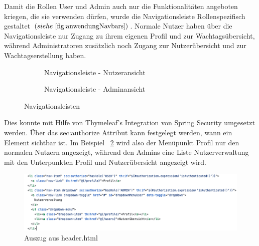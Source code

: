 \documentclass[fontsize=12pt,openright,oneside,paper=a4,BCOR=1cm]{scrbook}
\begin{document}
Damit die Rollen \glqq User\grqq{} und \glqq Admin\grqq{} auch nur die Funktionalit\"aten angeboten kriegen, die sie verwenden d\"urfen, wurde die Navigationsleiste Rollenspezifisch gestaltet $(siehe ~\ref{fig:anwendungNavbars})$. Normale Nutzer haben \"uber die Navigationsleiste nur Zugang zu ihrem eigenen Profil und zur Wachtags\"ubersicht, w\"ahrend Administratoren zus\"atzlich noch Zugang zur Nutzer\"ubersicht und zur Wachtagserstellung haben.

\begin{figure}[H]
  \centering
  \begin{subfigure}[b]{0.5\linewidth}
    \caption{Navigationsleiste - Nutzeransicht}
  \end{subfigure}
  \begin{subfigure}[b]{0.5\linewidth}
    \caption{Navigationsleiste - Adminansicht}
  \end{subfigure}
  \caption{Navigationsleisten}
  \label{fig:anwendungNavbars}
\end{figure}

Dies konnte mit Hilfe von Thymeleaf's Integration von Spring Security umgesetzt werden. \"Uber das \glqq sec:authorize\grqq{} Attribut kann festgelegt werden, wann ein Element sichtbar ist. Im Beispiel ~\ref{fig:code-navbar} wird also der Men\"upunkt \glqq Profil\grqq{} nur den normalen Nutzern angezeigt, w\"ahrend den Admins eine Liste \glqq Nutzerverwaltung\grqq{} mit den Unterpunkten \glqq Profil\grqq{} und \glqq Nutzer\"ubersicht\grqq{} angezeigt wird.

\begin{figure}[H]
  \centering
    \includegraphics[width=0.7\linewidth]{Anlagen/Code/navbar.png}
    \caption{Auszug aus header.html}
  \label{fig:code-navbar}
\end{figure}
\end{document}
